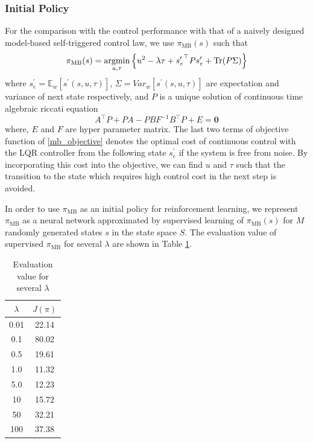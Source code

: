 \documentclass[english, dvipdfmx]{ampmt}             %
\newcommand{\argmin}{\mathop{\rm argmin}\limits}
\newcommand{\expect}{\mathbb{E}}
\begin{document}
\subsubsection{Initial Policy}
For the comparison with the control performance with that of a naively designed model-based self-triggered control law, we use $\pi_{\textrm{MB}}(s)$ such that
\begin{equation}
	\pi_{\textrm{MB}}(s) = \argmin_{u,\tau} \left\{u^2 - \lambda\tau + {s^{\prime}_e}^{\top}Ps^{\prime} _e+ \textrm{Tr}(P\Sigma)\right\} \label{mb_objective}
\end{equation}
where $s^{\prime}_e=\expect_{w}[s^{\prime}(s,u,\tau)]$, $\Sigma=Var_w[s^{\prime}(s,u,\tau)]$ are  expectation and variance of next state respectively, and $P$ is a unique solution of continuous time algebraic riccati equation
\begin{equation}
	A^{\top}P + PA - PBF^{-1}B^{\top}P + E = \bm{0}
\end{equation}
where, $E$ and $F$ are hyper parameter matrix. The last two terms of objective function of \eqref{mb_objective} denotes the optimal cost of continuous control with the LQR controller from the following state $s^{\prime}_e$ if the system is free from noise. By incorporating this cost into the objective, we can find $u$ and $\tau$ such that the transition to the state which requires high control cost in the next step is avoided.\par 
In order to use $\pi_{\textrm{MB}}$ as an initial policy for reinforcement learning, we represent $\pi_{\textrm{MB}}$ as a neural network approximated by supervised learning of $\pi_{\textrm{MB}}(s)$ for $M$ randomly generated states $s$ in the state space $S$. The evaluation value of supervised $\pi_{\textrm{MB}}$ for several $\lambda$ are shown in Table \ref{ev}.
\begin{table}[htb]
  \begin{center}
    \begin{tabular}{|cc|} \hline
      $\lambda$ & $J(\pi)$ \\ \hline 
      0.01 & 22.14 \\
      0.1 & 80.02 \\ %
      0.5 & 19.61 \\
      1.0 & 11.32 \\
      5.0 & 12.23 \\
      10 & 15.72 \\
      50 & 32.21 \\
      100 & 37.38 \\ \hline
    \end{tabular}
    \caption{Evaluation value for several $\lambda$}
    \label{ev}
  \end{center}
\end{table}
\end{document}
